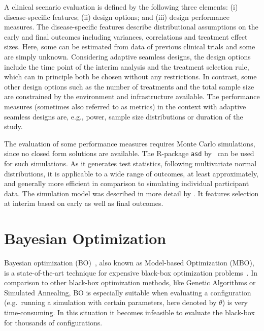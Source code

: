 \documentclass[bimj,fleqn]{w-art}
\theoremstyle{plain}
\theoremstyle{definition}
\begin{document}
A clinical scenario evaluation is defined by the following three elements: (i) disease-specific features; (ii) design options; and (iii) design performance measures.
The disease-specific features describe distributional assumptions on the early and final outcomes including variances, correlations and treatment effect sizes.
Here, some can be estimated from data of previous clinical trials and some are simply unknown. Considering adaptive seamless designs, the design options include the time point of the interim analysis and the treatment selection rule, which can in principle both be chosen without any restrictions.
In contrast, some other design options such as the number of treatments and the total sample size are constrained by the environment and infrastructure available.
The performance measures (sometimes also referred to as metrics) in the context with adaptive seamless designs are, e.g., power, sample size distributions or duration of the study.

The evaluation of some performance measures requires Monte Carlo simulations, since no closed form solutions are available. 
The R-package \texttt{asd} by~\citet{parsons_package_2012} can be used for such simulations.
As it generates test statistics, following multivariate normal distributions, it is applicable to a wide range of outcomes, at least approximately, and generally more efficient in comparison to simulating individual participant data.
The simulation model was described in more detail by \citet{friede_adaptive_2020}. 
It features selection at interim based on early as well as final outcomes.


\section{Bayesian Optimization}
\label{sec:bayesian_optimization}

Bayesian optimization (BO)~\citep{jones_taxonomy_2001}, also known as Model-based Optimization (MBO), is a state-of-the-art technique for expensive black-box optimization problems~\citep{shahriari_taking_2016}.
In comparison to other black-box optimization methods, like Genetic Algorithms or Simulated Annealing, BO is especially suitable when evaluating a configuration (e.g.\ running a simulation with certain parameters, here denoted by $\theta$) is very time-consuming.
In this situation it becomes infeasible to evaluate the black-box for thousands of configurations.
\end{document}
